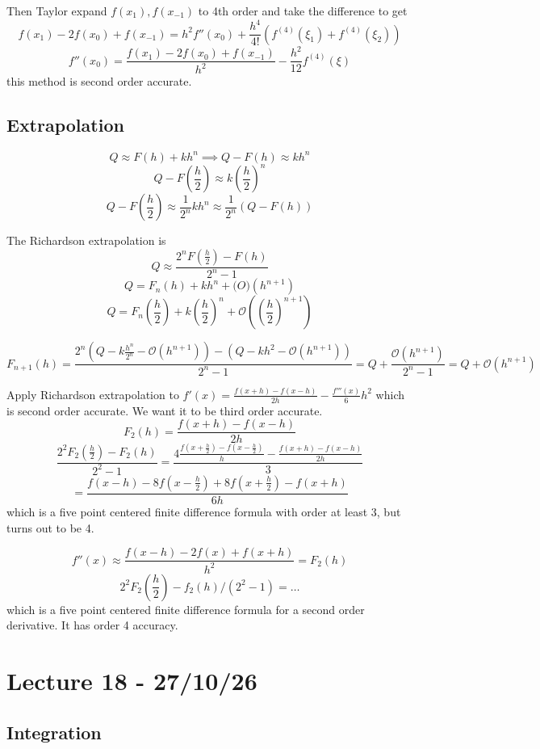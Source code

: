 \documentclass[11pt]{article}
\begin{document}
Then Taylor expand $f(x_1), f(x_{-1})$ to 4th order and take the difference to get 
\[
    f(x_1) - 2f(x_0)+f(x_{-1}) = h^2f''(x_0) + \frac{h^4}{4!}(f^{(4)}(\xi_1)+f^{(4)}(\xi_2))
\]
\[
    f''(x_0) = \frac{f(x_1)-2f(x_0)+f(x_{-1})}{h^2} - \frac{h^2}{12}f^{(4)}(\xi)
\]
this method is second order accurate.


\subsection{Extrapolation}
\[
    Q \approx F(h) + kh^n \implies Q-F(h) \approx kh^n
\]
\[
    Q - F(\frac{h}{2}) \approx k(\frac{h}{2})^n
\]
\[
    Q - F(\frac{h}{2}) \approx \frac{1}{2^n}kh^n \approx \frac{1}{2^n}(Q-F(h))
\]

The Richardson extrapolation is 
\[
    Q \approx \frac{2^n F(\frac{h}{2}) - F(h)}{2^n-1}
\]
\[
    Q = F_n(h) + kh^n + \mathcal(O)(h^{n+1})
\]
\[
    Q = F_n(\frac{h}{2})+k (\frac{h}{2})^n + \mathcal{O}((\frac{h}{2})^{n+1})
\]

\[
    F_{n+1}(h) = \frac{2^n(Q-k \frac{h^n}{2^n} - \mathcal{O}(h^{n+1})) - (Q-kh^2-\mathcal{O}(h^{n+1}))}{2^n-1} = Q + \frac{\mathcal{O}(h^{n+1})}{2^n-1} = Q + \mathcal{O}(h^{n+1})
\]

\begin{example}
    Apply Richardson extrapolation to $f'(x) = \frac{f(x+h)-f(x-h)}{2h}-\frac{f'''(x)}{6}h^2$ which is second order accurate. We want it to be third order accurate.
    \[
        F_2(h) = \frac{f(x+h)-f(x-h)}{2h}
    \]
    \[
        \frac{2^2F_{2}(\frac{h}{2})-F_2(h)}{2^2-1} = \frac{4 \frac{f(x+\frac{h}{2})-f(x-\frac{h}{2})}{h}-\frac{f(x+h)-f(x-h)}{2h}}{3}
    \]
    \[
        = \frac{f(x-h)-8f(x-\frac{h}{2})+8f(x+\frac{h}{2})-f(x+h)}{6h}
    \]
    which is a five point centered finite difference formula with order at least 3, but turns out to be 4.
\end{example}

\begin{example}
    \[
        f''(x) \approx \frac{f(x-h)-2f(x)+f(x+h)}{h^2} = F_2(h)
    \]
    \[
        2^2F_2(\frac{h}{2})-f_2(h)/(2^2-1) = \dots
    \]
    which is a five point centered finite difference formula for a second order derivative. It has order 4 accuracy.
\end{example}


\section{Lecture 18 - 27/10/26}
\subsection{Integration}
\end{document}

